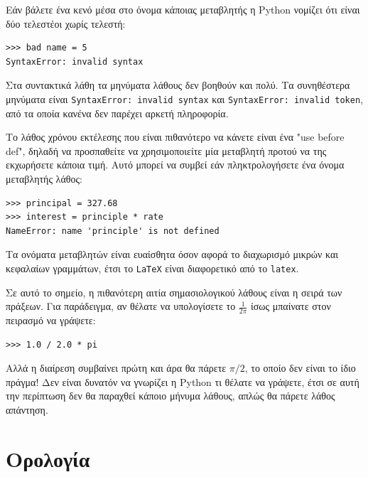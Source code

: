 \documentclass[10pt]{book}
\begin{document}
Εάν βάλετε ένα κενό μέσα στο όνομα κάποιας μεταβλητής η Python 
νομίζει ότι είναι δύο τελεστέοι χωρίς τελεστή:


\begin{verbatim}
>>> bad name = 5
SyntaxError: invalid syntax
\end{verbatim}
%

Στα συντακτικά λάθη τα μηνύματα λάθους δεν βοηθούν και πολύ.  
Τα συνηθέστερα μηνύματα είναι  {\tt SyntaxError: invalid syntax} 
και  {\tt SyntaxError: invalid token},  από τα οποία κανένα δεν
παρέχει αρκετή πληροφορία.

Το λάθος χρόνου εκτέλεσης που είναι πιθανότερο να κάνετε είναι
ένα "use before def", δηλαδή να προσπαθείτε να χρησιμοποιείτε
μία μεταβλητή προτού να της εκχωρήσετε κάποια τιμή.  Αυτό μπορεί να συμβεί
εάν πληκτρολογήσετε ένα όνομα μεταβλητής λάθος:


\begin{verbatim}
>>> principal = 327.68
>>> interest = principle * rate
NameError: name 'principle' is not defined
\end{verbatim}
%

Τα ονόματα μεταβλητών είναι ευαίσθητα όσον αφορά το διαχωρισμό
μικρών και κεφαλαίων γραμμάτων, έτσι το  {\tt LaTeX}  είναι
διαφορετικό από το  {\tt latex}.


Σε αυτό το σημείο, η πιθανότερη αιτία σημασιολογικού λάθους
είναι η σειρά των πράξεων. Για παράδειγμα, αν θέλατε να υπολογίσετε το 
$\frac{1}{2 \pi}$ ίσως μπαίνατε στον πειρασμό να γράψετε:

\begin{verbatim}
>>> 1.0 / 2.0 * pi
\end{verbatim}
%

Αλλά η διαίρεση συμβαίνει πρώτη και άρα θα πάρετε $\pi / 2$, το
οποίο δεν είναι το ίδιο πράγμα!  Δεν είναι δυνατόν να γνωρίζει η
Python τι θέλατε να γράψετε, έτσι σε αυτή την περίπτωση
δεν θα παραχθεί κάποιο μήνυμα λάθους, απλώς θα πάρετε λάθος απάντηση.


\section{Ορολογία}
\end{document}
